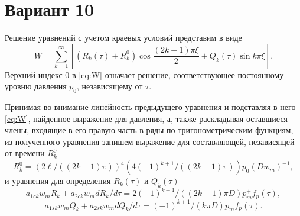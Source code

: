 \documentclass{article}
\begin{document}
\setlength{\abovedisplayskip}{7pt}
\setlength{\belowdisplayskip}{7pt}
\section*{Вариант 10}
Решение уравнений с учетом краевых условий представим в виде
\begin{equation}
    \label{eq:W}
    W =  \sum\limits_{k=1}^{\infty} \left[\left(R_k(\tau)+R_k^0
    \right)\cos\frac{(2k - 1)\pi\xi}{2}+Q_k(\tau)\sin
    k\pi\xi\right].
\end{equation}
Верхний индекс 0 в \eqref{eq:W} означает решение, соответствующее постоянному
уровню давления $p_0$, независящему от $\tau$.

Принимая во внимание линейность предыдущего уравнения и подставляя в него
\eqref{eq:W}, найденное выражение для давления, а, также раскладывая оставшиеся
члены, входящие в его правую часть в ряды по тригонометрическим функциям, из
полученного уравнения запишем выражение для составляющей, независящей от
времени $R_k^0$
\begin{equation*}
    R_k^0 = (2\ell/((2k - 1)\pi))^4\left(4(-1)^{k + 1}/((2k - 1)\pi)\right)
    p_0(Dw_m)^{-1},
\end{equation*}
и уравнения для определения $R_k(\tau)$ и $Q_k(\tau)$
\begin{equation}
    a_{1ck}w_mR_k+a_{2ck}w_mdR_k/d\tau = 2(-1)^{k + 1}/((2k - 1)\pi D)
    p_m^+f_p(\tau),
\end{equation}
\begin{equation}
    a_{1sk}w_mQ_k+a_{2sk}w_mdQ_k/d\tau = (-1)^{k + 1}/(k\pi D)p_m^+f_p(\tau).
\end{equation}
\end{document}
